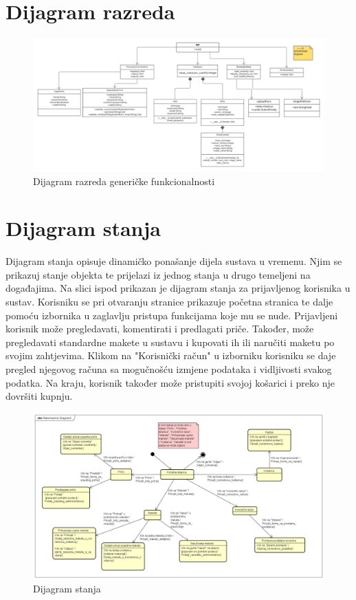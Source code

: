 			
		\section{Dijagram razreda}
		
			\begin{figure}[H]
						\includegraphics[width=.9\linewidth]{dijagrami/UML_class.PNG} %
						\caption{Dijagram razreda generičke funkcionalnosti}
						\label{fig:diraz1} %
					\end{figure}
		
		\section{Dijagram stanja}
			
			
			Dijagram stanja opisuje dinamičko ponašanje dijela sustava u vremenu. Njim se prikazuj stanje objekta te prijelazi iz jednog stanja u drugo temeljeni na događajima. Na slici ispod prikazan je dijagram stanja za prijavljenog korisnika u sustav. Korisniku se pri otvaranju stranice prikazuje početna stranica te dalje pomoću izbornika u zaglavlju pristupa funkcijama koje mu se nude. Prijavljeni korisnik može pregledavati, komentirati i predlagati priče. Također, može pregledavati standardne makete u sustavu i kupovati ih ili naručiti maketu po svojim zahtjevima. Klikom na "Korisnički račun" u izborniku korisniku se daje pregled njegovog računa sa mogučnošću izmjene podataka i vidljivosti svakog podatka. Na kraju, korisnik također može pristupiti svojoj košarici i preko nje dovršiti kupnju.
			
			\begin{figure}[H]
				\includegraphics[width=1\linewidth]{slike/Dijagram_stanja.PNG} %
				\caption{Dijagram stanja}
				\label{fig:dijstan} %
			\end{figure}
			
